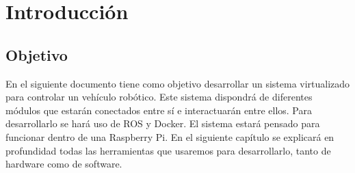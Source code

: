 \chapter{Introducción}

	\section{Objetivo}
	En el siguiente documento tiene como objetivo desarrollar un sistema virtualizado para controlar un vehículo robótico. Este sistema dispondrá de diferentes módulos que estarán conectados entre sí e interactuarán entre ellos. Para desarrollarlo se hará uso de ROS y Docker. El sistema estará pensado para funcionar dentro de una Raspberry Pi. En el siguiente capítulo se explicará en profundidad todas las herramientas que usaremos para desarrollarlo, tanto de hardware como de software.